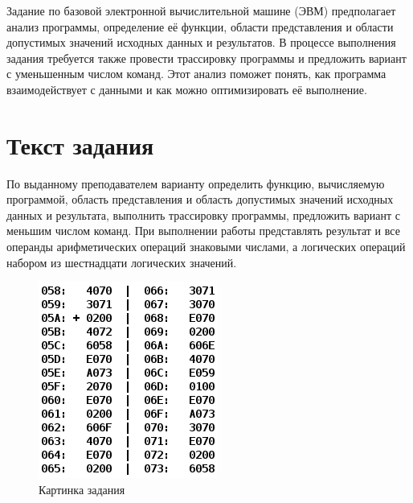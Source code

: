 \documentclass[14pt]{extreport}
\begin{document}
    \pagestyle{empty} %
    

    \pagestyle{plain} %
    \tableofcontents
    \intro

    Задание по базовой электронной вычислительной машине (ЭВМ) предполагает анализ программы, определение её функции, области представления и области допустимых значений исходных данных и результатов. В процессе выполнения задания требуется также провести трассировку программы и предложить вариант с уменьшенным числом команд. Этот анализ поможет понять, как программа взаимодействует с данными и как можно оптимизировать её выполнение.


    \chapter{Текст задания}
        По выданному преподавателем варианту определить функцию, вычисляемую программой, область представления и область допустимых значений исходных данных и результата, выполнить трассировку программы, предложить вариант с меньшим числом команд. При выполнении работы представлять результат и все операнды арифметических операций знаковыми числами, а логических операций набором из шестнадцати логических значений.

        \begin{figure}[!h]
            \centering
            \includegraphics[width=0.4\linewidth]{img.png}
            \caption{Картинка задания}

        \end{figure}
\end{document}
